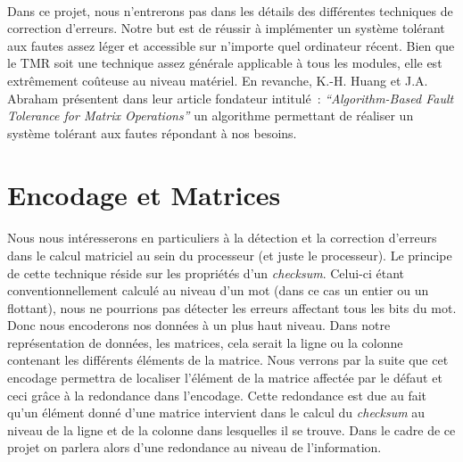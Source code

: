 \documentclass[a4paper,10pt]{report}
\begin{document}
\paragraph*{}
Dans ce projet, nous n’entrerons pas dans les détails des différentes techniques de correction d’erreurs. 
Notre but est de réussir à implémenter un système tolérant aux fautes assez léger et accessible sur n’importe 
quel ordinateur récent. Bien que le TMR soit une technique assez générale applicable à tous les modules, elle 
est extrêmement coûteuse au niveau matériel. 
En revanche, K.-H. Huang et J.A. Abraham présentent dans leur article fondateur intitulé : \textit{``Algorithm-Based 
Fault Tolerance for Matrix Operations''} un algorithme permettant de réaliser un système tolérant aux fautes 
répondant à nos besoins.
\newpage
\section{Encodage et Matrices}
\paragraph*{}
Nous nous intéresserons en particuliers à la détection et la correction d’erreurs dans le calcul matriciel 
au sein du processeur (et juste le processeur). Le principe de cette technique réside sur les propriétés d’un 
\textit{checksum}. Celui-ci étant conventionnellement calculé au niveau d’un mot (dans ce cas un entier ou un flottant), 
nous ne pourrions pas détecter les erreurs affectant tous les bits du mot. Donc nous encoderons nos données à 
un plus haut niveau.\newline
Dans notre représentation de données, les matrices, cela serait la ligne ou la colonne contenant les différents 
éléments de la matrice. Nous verrons par la suite que cet encodage permettra de localiser l’élément de la matrice 
affectée par le défaut et ceci grâce à la redondance dans l’encodage. Cette redondance est due au fait qu’un élément 
donné d’une matrice intervient dans le calcul du \textit{checksum} au niveau de la ligne et de la colonne dans lesquelles il 
se trouve. Dans le cadre de ce projet on parlera alors d’une redondance au niveau de l’information.
\end{document}
